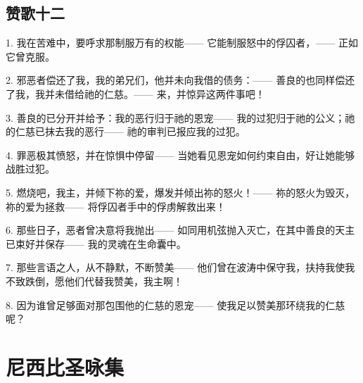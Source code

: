 
\subsection{赞歌十二}

1. 我在苦难中，要呼求那制服万有的权能—— 它能制服怒中的俘囚者，—— 正如它曾克服。\par

2. 邪恶者偿还了我，我的弟兄们，他并未向我借的债务：—— 善良的也同样偿还了我，我并未借给祂的仁慈。—— 来，并惊异这两件事吧！\par

3. 善良的已分开并给予：我的恶行归于祂的恩宠—— 我的过犯归于祂的公义；祂的仁慈已抹去我的恶行—— 祂的审判已报应我的过犯。\par

4. 罪恶极其愤怒，并在惊惧中停留—— 当她看见恩宠如何约束自由，好让她能够战胜过犯。\par

5. 燃烧吧，我主，并倾下祢的爱，爆发并倾出祢的怒火！—— 祢的怒火为毁灭，祢的爱为拯救—— 将俘囚者手中的俘虏解救出来！\par

6. 那些日子，恶者曾决意将我抛出—— 如同用机弦抛入灭亡，在其中善良的天主已束好并保存—— 我的灵魂在生命囊中。\par

7. 那些言语之人，从不静默，不断赞美—— 他们曾在波涛中保守我，扶持我使我不致跌倒，愿他们代替我赞美，我主啊！\par

8. 因为谁曾足够面对那包围他的仁慈的恩宠—— 使我足以赞美那环绕我的仁慈呢？\par



\section{尼西比圣咏集}


